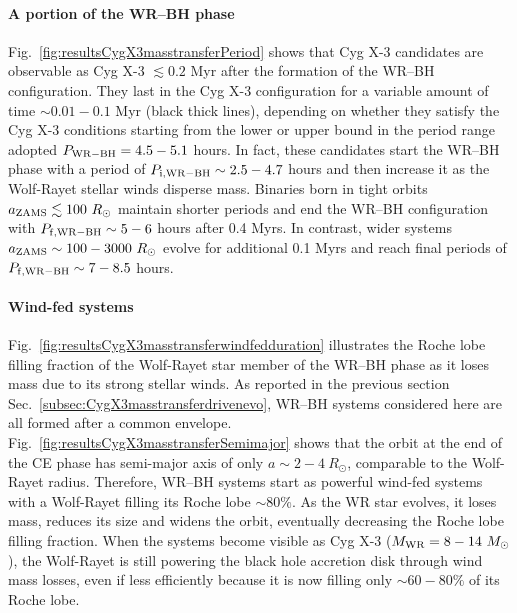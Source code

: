 \documentclass[a4paper,titlepage]{book}     	%
\newcommand{\sun}{\ensuremath{_\odot}}
\newcommand{\msun}{\ensuremath{M\sun}}
\newcommand{\rsun}{R_{\odot}}
\newcommand{\mwr}{\ensuremath{M_\textup{WR}}}
\begin{document}
\paragraph{A portion of the WR--BH phase} Fig.\ \ref{fig:resultsCygX3masstransferPeriod} shows that Cyg X-3 candidates are observable as Cyg X-3 $\lesssim 0.2$ Myr after the formation of the WR--BH configuration. They last in the Cyg X-3 configuration for a variable amount of time $\sim 0.01-0.1$ Myr  (black thick lines), depending on whether they satisfy the Cyg X-3 conditions starting from the lower or upper bound in the period range adopted $P_{\rm WR-BH}=4.5-5.1$ hours. In fact, these candidates start the WR--BH phase with a period of $P_{\rm i, WR-BH} \sim 2.5-4.7$ hours and then increase it as the Wolf-Rayet stellar winds disperse mass. Binaries born in tight orbits $a_{\rm ZAMS} \lesssim 100~\rsun$ maintain shorter periods and end the WR--BH configuration with $P_{\rm f,WR-BH} \sim 5-6$ hours after 0.4 Myrs. In contrast, wider systems $a_{\rm ZAMS} \sim 100 - 3000~\rsun$ evolve for additional 0.1 Myrs and reach final periods of $P_{\rm f,WR-BH} \sim 7-8.5$ hours.

\paragraph{Wind-fed systems} Fig.\ \ref{fig:resultsCygX3masstransferwindfedduration} illustrates the Roche lobe filling fraction of the Wolf-Rayet star member of the WR--BH phase as it loses mass due to its strong stellar winds. As reported in the previous section Sec.\ \ref{subsec:CygX3masstransferdrivenevo}, WR--BH systems considered here are all formed after a common envelope. Fig.\ \ref{fig:resultsCygX3masstransferSemimajor} shows that the orbit at the end of the CE phase has semi-major axis of only $a \sim 2-4~\rsun$, comparable to the Wolf-Rayet radius. Therefore, WR--BH systems start as powerful wind-fed systems with a Wolf-Rayet filling its Roche lobe $\sim 80\%$. As the WR star evolves, it loses mass, reduces its size and widens the orbit, eventually decreasing the Roche lobe filling fraction. When the systems become visible as Cyg X-3 ($\mwr = 8-14~\msun$), the Wolf-Rayet is still powering the black hole accretion disk through wind mass losses, even if less efficiently because it is now filling only $\sim 60-80\%$ of its Roche lobe. 
\end{document}
